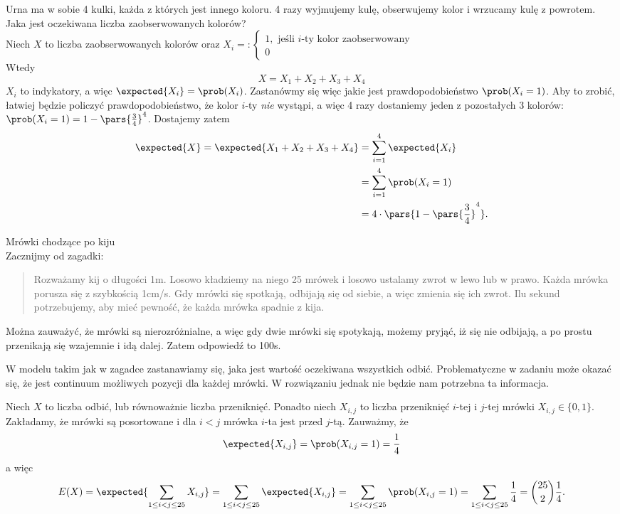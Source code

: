 \begin{example} Urna ma w sobie 4 kulki, każda z których jest innego koloru. 4 razy wyjmujemy kulę, obserwujemy kolor i wrzucamy kulę z powrotem. Jaka jest oczekiwana liczba zaobserwowanych kolorów?\\
	Niech \(X\) to liczba zaobserwowanych kolorów oraz 
	\(
		X_i =:
		\begin{cases}
			1, \text{ jeśli } i \text{-ty kolor zaobserwowany}\\
			0
		\end{cases}
	\)\\
	Wtedy
	\[
		X = X_1 + X_2 + X_3 + X_4
	\]
	\(X_i\) to indykatory, a więc \(\expected{X_i} = \prob(X_i)\). Zastanówmy się więc jakie jest prawdopodobieństwo \(\prob(X_i = 1)\). Aby to zrobić, łatwiej będzie policzyć prawdopodobieństwo, że kolor \(i\)-ty \textit{nie} wystąpi, a więc 4 razy dostaniemy jeden z pozostałych 3 kolorów: \(\prob(X_i = 1) = 1 - \pars{\frac{3}{4}}^4\). Dostajemy zatem
	\begin{align*}
		\expected{X} = \expected{X_1 + X_2 + X_3 + X_4} &= \sum_{i=1}^4 \expected{X_i} \\
		&= \sum_{i=1}^4 \prob(X_i = 1) \\
		&= 4 \cdot \pars{ 1 - \pars{\frac{3}{4}}^4 }.
	\end{align*}
\end{example}

\begin{example} Mrówki chodzące po kiju\\
	Zacznijmy od zagadki:
	\begin{quote}
		Rozważamy kij o długości 1m. Losowo kładziemy na niego 25 mrówek i losowo ustalamy zwrot w lewo lub w prawo. Każda mrówka porusza się z szybkością 1cm/s. Gdy mrówki się spotkają, odbijają się od siebie, a więc zmienia się ich zwrot. Ilu sekund potrzebujemy, aby mieć pewność, że każda mrówka spadnie z kija.
	\end{quote}
	Można zauważyć, że mrówki są nierozróżnialne, a więc gdy dwie mrówki się spotykają, możemy pryjąć, iż się nie odbijają, a po prostu przenikają się wzajemnie i idą dalej. Zatem odpowiedź to 100s.
	
	W modelu takim jak w zagadce zastanawiamy się, jaka jest wartość oczekiwana wszystkich odbić. Problematyczne w zadaniu może okazać się, że jest continuum możliwych pozycji dla każdej mrówki. W rozwiązaniu jednak nie będzie nam potrzebna ta informacja.
	
	Niech \(X\) to liczba odbić, lub równoważnie liczba przeniknięć. Ponadto niech \(X_{i,j}\) to liczba przeniknięć \(i\)-tej i \(j\)-tej mrówki \(X_{i, j} \in \{0, 1\}\). Zakładamy, że mrówki są posortowane i dla \(i < j\) mrówka \(i\)-ta jest przed \(j\)-tą. Zauważmy, że 
	\[
		\expected{X_{i,j}} = \prob(X_{i,j} = 1) = \frac{1}{4}
	\]
	a więc
	\[
		E(X) = \expected{\sum_{1 \leq i < j \leq 25} X_{i,j}} = \sum_{1 \leq i < j \leq 25} \expected{X_{i,j}} = \sum_{1 \leq i < j \leq 25} \prob(X_{i,j} = 1) = \sum_{1 \leq i < j \leq 25} \frac{1}{4} = \binom{25}{2} \frac{1}{4}.
	\]
\end{example}

